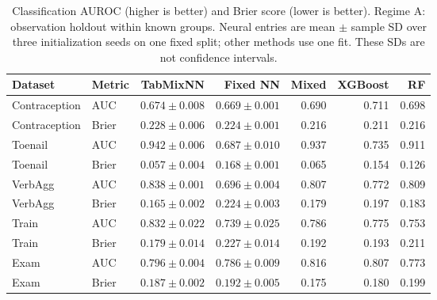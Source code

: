 \begin{table}[htbp]
\centering
\small
\caption{Classification AUROC (higher is better) and Brier score (lower is better). Regime A: observation holdout within known groups. Neural entries are mean $\pm$ sample SD over three initialization seeds on one fixed split; other methods use one fit. These SDs are not confidence intervals.}
\label{tab:classification_A}
\begin{tabular}{llrrrrr}
\toprule
Dataset & Metric & TabMixNN & Fixed NN & Mixed & XGBoost & RF \\
\midrule
Contraception & AUC & $0.674 \pm 0.008$ & $0.669 \pm 0.001$ & 0.690 & 0.711 & 0.698 \\
Contraception & Brier & $0.228 \pm 0.006$ & $0.224 \pm 0.001$ & 0.216 & 0.211 & 0.216 \\
Toenail & AUC & $0.942 \pm 0.006$ & $0.687 \pm 0.010$ & 0.937 & 0.735 & 0.911 \\
Toenail & Brier & $0.057 \pm 0.004$ & $0.168 \pm 0.001$ & 0.065 & 0.154 & 0.126 \\
VerbAgg & AUC & $0.838 \pm 0.001$ & $0.696 \pm 0.004$ & 0.807 & 0.772 & 0.809 \\
VerbAgg & Brier & $0.165 \pm 0.002$ & $0.224 \pm 0.003$ & 0.179 & 0.197 & 0.183 \\
Train & AUC & $0.832 \pm 0.022$ & $0.739 \pm 0.025$ & 0.786 & 0.775 & 0.753 \\
Train & Brier & $0.179 \pm 0.014$ & $0.227 \pm 0.014$ & 0.192 & 0.193 & 0.211 \\
Exam & AUC & $0.796 \pm 0.004$ & $0.786 \pm 0.009$ & 0.816 & 0.807 & 0.773 \\
Exam & Brier & $0.187 \pm 0.002$ & $0.192 \pm 0.005$ & 0.175 & 0.180 & 0.199 \\
\bottomrule
\end{tabular}
\end{table}
